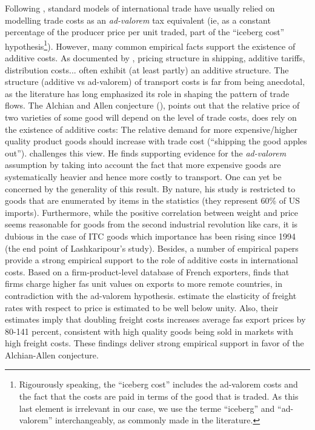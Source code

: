 \documentclass[a4paper,11pt]{article}
\begin{document}
Following \citet{samuelson1954}, standard models of international trade have usually relied on modelling trade costs as an \emph{ad-valorem} tax equivalent (ie, as a constant percentage of the producer price per unit traded, part of the ``iceberg cost'' hypothesis\footnote{Rigourously speaking, the ``iceberg cost'' includes the ad-valorem costs and the fact that the costs are paid in terms of the good that is traded. As this last element is irrelevant in our case, we use the terme ``iceberg'' and ``ad-valorem'' interchangeably, as commonly made in the literature.}). However, many common empirical facts support the existence of additive costs. As documented by \citet{Irrazabal_2015}, pricing structure in shipping, additive tariffs, distribution costs... often exhibit (at least partly) an additive structure. The structure (additive vs ad-valorem) of transport costs is far from being anecdotal, as the literature has long emphasized its role in shaping the pattern of trade flows. The Alchian and Allen conjecture (\citealp{alchian}), points out that the relative price of two varieties of some good will depend on the level of trade costs, does rely on the existence of additive costs: The relative demand for more expensive/higher quality product goods should increase with trade cost (``shipping the good apples out''). \citet{Lashkaripour-mimeo-2016} challenges this view. He finds supporting evidence for the \emph{ad-valorem} assumption by taking into account the fact that more expensive goods are systematically heavier and hence more costly to transport. One can yet be concerned by the generality of this result. By nature, his study is restricted to goods that are enumerated by items in the statistics (they represent 60\% of US imports). Furthermore, while the positive correlation between weight and price seems reasonable for goods from the second industrial revolution like cars, it is dubious in the case of ITC goods which importance has been rising since 1994 (the end point of Lashkaripour's study). Besides, a number of empirical papers provide a strong empirical support to the role of additive costs in international costs. Based on a firm-product-level database of French exporters, \citet{martin2012} finds that firms charge higher fas unit values on exports to more remote countries, in contradiction with the ad-valorem hypothesis. \citet{hummels_skiba} estimate the elasticity of freight rates with respect to price is estimated to be well below unity. Also, their estimates imply that doubling freight costs increases average fas export prices by 80-141 percent, consistent with high quality goods being sold in markets with high freight costs. These findings deliver strong empirical support in favor of the Alchian-Allen conjecture.
\smallskip
\end{document}
